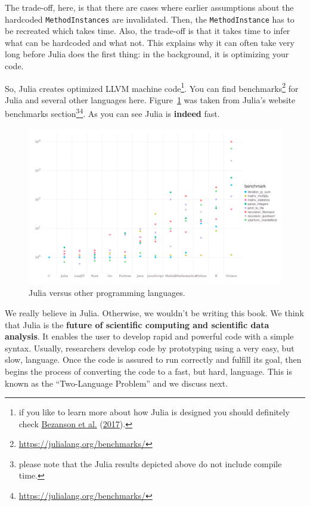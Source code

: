 \documentclass[
  notoc %
]{tufte-book}
\DeclareRobustCommand{\href}[2]{#2\footnote{\url{#1}}}
\newcommand{\passthrough}[1]{#1}
\begin{document}
The trade-off, here, is that there are cases where earlier assumptions
about the hardcoded \passthrough{\lstinline!MethodInstances!} are
invalidated. Then, the \passthrough{\lstinline!MethodInstance!} has to
be recreated which takes time. Also, the trade-off is that it takes time
to infer what can be hardcoded and what not. This explains why it can
often take very long before Julia does the first thing: in the
background, it is optimizing your code.

So, Julia creates optimized LLVM machine code\footnote{if you like to
  learn more about how Julia is designed you should definitely check
  \protect\hyperlink{ref-bezanson2017julia}{Bezanson et al.}
  (\protect\hyperlink{ref-bezanson2017julia}{2017}).}. You can find
\href{https://julialang.org/benchmarks/}{benchmarks} for Julia and
several other languages here. Figure~\ref{fig:benchmarks} was taken from
\href{https://julialang.org/benchmarks/}{Julia's website benchmarks
section\footnote{please note that the Julia results depicted above do
  not include compile time.}}. As you can see Julia is \textbf{indeed}
fast.

\begin{figure}
\hypertarget{fig:benchmarks}{%
\centering
\includegraphics{images/benchmarks.png}
\caption{Julia versus other programming
languages.}\label{fig:benchmarks}
}
\end{figure}

We really believe in Julia. Otherwise, we wouldn't be writing this book.
We think that Julia is the \textbf{future of scientific computing and
scientific data analysis}. It enables the user to develop rapid and
powerful code with a simple syntax. Usually, researchers develop code by
prototyping using a very easy, but slow, language. Once the code is
assured to run correctly and fulfill its goal, then begins the process
of converting the code to a fast, but hard, language. This is known as
the ``Two-Language Problem'' and we discuss next.
\end{document}
